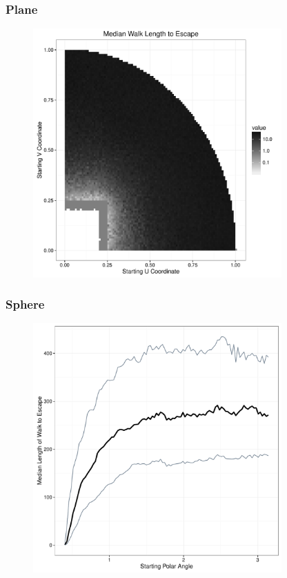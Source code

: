 \documentclass{beamer}
\begin{document}

\begin{frame}
	
	\frametitle{Plane}
	
	\begin{figure}
		\includegraphics[width=0.85\textwidth]{images/PlaneCircleL05.pdf}
	\end{figure}
	
\end{frame}


\begin{frame}
	
	\frametitle{Sphere}
	
	\begin{figure}
		\includegraphics[width=0.85\textwidth]{images/ExampleSphereL04.pdf}
	\end{figure}
	
\end{frame}
\end{document}
